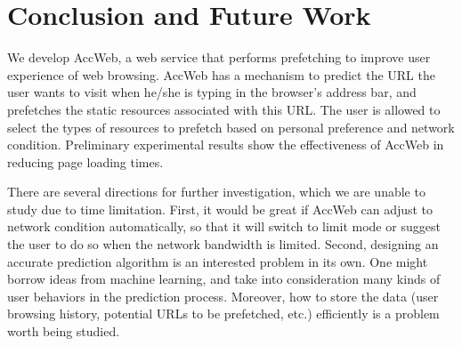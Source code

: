 \section{Conclusion and Future Work}
\label{sec:conclusion}

We develop AccWeb, a web service that performs prefetching to improve user experience of web browsing. AccWeb has a mechanism to predict the URL the user wants to visit when he/she is typing in the browser's address bar, and prefetches the static resources associated with this URL. The user is allowed to select the types of resources to prefetch based on personal preference and network condition. Preliminary experimental results show the effectiveness of AccWeb in reducing page loading times.

There are several directions for further investigation, which we are unable to study due to time limitation. First, it would be great if AccWeb can adjust to network condition automatically, so that it will switch to limit mode or suggest the user to do so when the network bandwidth is limited. Second, designing an accurate prediction algorithm is an interested problem in its own. One might borrow ideas from machine learning, and take into consideration many kinds of user behaviors in the prediction process. Moreover, how to store the data (user browsing history, potential URLs to be prefetched, etc.) efficiently is a problem worth being studied.
